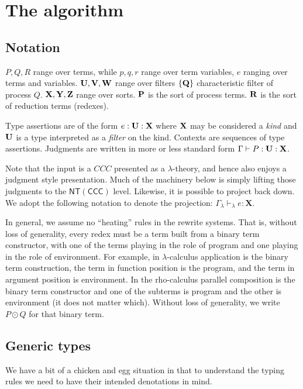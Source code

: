\section{The algorithm}
\subsection{Notation}
$P, Q, R$ range over terms, while $p, q, r$ range over term variables,
$e$ ranging over terms and variables.  $\bold{U}, \bold{V}, \bold{W}$
range over filters $\bold{\{ Q \}}$ characteristic filter of process
$Q$.  $\bold{X}, \bold{Y}, \bold{Z}$ range over sorts.  $\bold{P}$ is
the sort of process terms.  $\bold{R}$ is the sort of reduction terms
(redexes).

Type assertions are of the form $e : \bold{U} : \bold{X}$ where
$\bold{X}$ may be considered a \emph{kind} and $\bold{U}$ is a type
interpreted as a \emph{filter} on the kind. Contexts are sequences of
type assertions. Judgments are written in more or less standard form
$\Gamma \vdash P : \bold{U} : \bold{X}$. 

Note that the input is a $CCC$ presented as a $\lambda$-theory, and
hence also enjoys a judgment style presentation. Much of the machinery
below is simply lifting those judgments to the
$\mathsf{NT}(\mathsf{CCC})$ level. Likewise, it is possible to project
back down. We adopt the following notation to denote the projection:
$\Gamma_{\lambda} \vdash_{\lambda} e : \mathbf{X}$.

In general, we assume no ``heating'' rules in the rewrite
systems. That is, without loss of generality, every redex must be a
term built from a binary term constructor, with one of the terms
playing in the role of program and one playing in the role of
environment. For example, in $\lambda$-calculus application is the
binary term construction, the term in function position is the
program, and the term in argument position is environment. In the
rho-calculus parallel composition is the binary term constructor and
one of the subterms is program and the other is environment (it does
not matter which). Without loss of generality, we write $P \odot Q$
for that binary term.

\subsection{Generic types}

We have a bit of a chicken and egg situation in that to understand the typing rules we need to have their intended denotations in mind.

